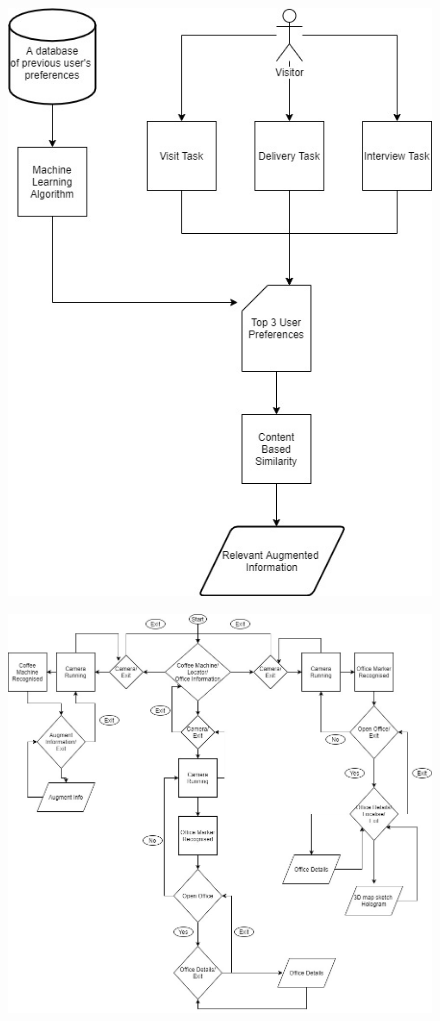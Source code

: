 \documentclass{aifyp}
\begin{document}
\begin{appendices}
\begin{figure}[H]
    \centering
    \includegraphics[scale=0.4]{Images/Chapter4/VisitorQueryModel.jpg}
    \label{fig:VisitorQueryModel}
\end{figure}
\begin{figure}[H]
    \centering
    \includegraphics[scale=0.4]{Images/Chapter4/SystemArchitecture.jpg}

\end{figure}
\end{appendices}
\end{document}
